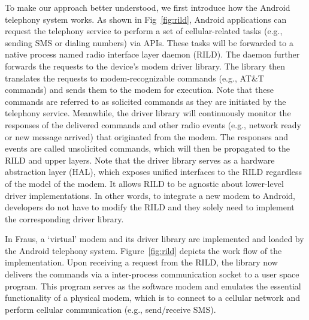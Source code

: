 \documentclass[conference]{IEEEtranl}
\begin{document}
	To make our approach better understood, we first introduce how the Android telephony system works.
	As shown in Fig~\ref{fig:rild}, 
	Android applications can request the telephony service to perform a set of cellular-related tasks (e.g., sending SMS or dialing numbers) via APIs.  These tasks will be forwarded to a native process named radio interface layer daemon (RILD). The daemon further forwards the requests to the device's modem driver library.
	The library then translates the requests to modem-recognizable commands (e.g., AT\&T commands) and sends them to the modem for execution. Note that these commands are referred to as solicited commands as they are initiated by the telephony service. Meanwhile, the driver library will continuously monitor the responses of the delivered commands and other radio events (e.g., network ready or new message arrived) that originated from the modem. The responses and events are called unsolicited commands, which will then be propagated to the RILD and upper layers.
	 Note that the driver library serves as a hardware abstraction layer (HAL), which exposes unified interfaces to the RILD regardless of the model of the modem. It allows RILD to be agnostic about lower-level driver implementations. In other words, to integrate a new modem to Android, developers do not have to modify the RILD and they solely need to implement the corresponding driver library.


	In Fraus, a `virtual' modem and its driver library are implemented and loaded by the Android telephony system. Figure~\ref{fig:rild} depicts the work flow of the implementation. Upon receiving a request from the RILD, the library now delivers the commands via a inter-process communication socket to a user space program. This program serves as the software modem and emulates the essential functionality of a physical modem, which is to connect to a cellular network and perform cellular communication (e.g., send/receive SMS). 
\end{document}
